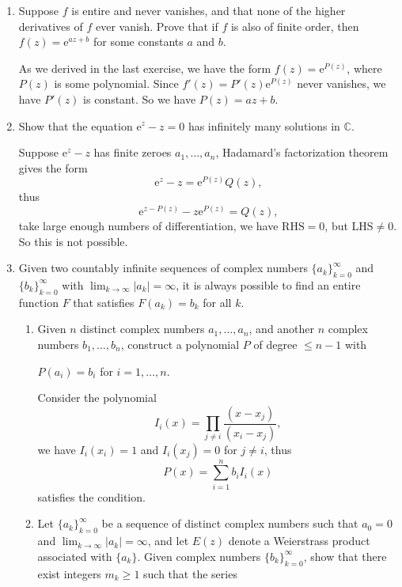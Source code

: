 \documentclass[11pt]{report}
\theoremstyle{mythm}
\let\oldendproof\endproof
\renewenvironment{proof}[1][\proofname]{%
  \oldproof[\normalfont \bfseries #1]%
}{\oldendproof}
\renewcommand*{\proofname}{Proof}
\theoremstyle{myans}
\newcommand{\me}{\mathrm{e}}
\newcommand{\bbC}{\mathbb{C}}
\begin{document}
\begin{enumerate}
  \item Suppose $f$ is entire and never vanishes, and that none of the higher derivatives of $f$ ever
  vanish. Prove that if $f$ is also of finite order, then $f(z) = \me^{az+b}$ for some constants $a$ and $b$.
  \begin{proof}
    As we derived in the last exercise, we have the form $f(z) = \me^{P(z)}$, where $P(z)$ is some
    polynomial. Since $f'(z) = P'(z)\me^{P(z)}$ never vanishes, we have $P'(z)$ is constant.
    So we have $P(z) = az+b$.
  \end{proof}
  \item Show that the equation $\me^z - z = 0$ has infinitely many solutions in $\bbC$.
  \begin{proof}
    Suppose $\me^z - z$ has finite zeroes $a_1,\dots,a_n$, Hadamard's factorization theorem gives
    the form
    \[ \me^z - z = \me^{P(z)} Q(z), \]
    thus
    \[ \me^{z-P(z)} - z\me^{P(z)} = Q(z), \]
    take large enough numbers of differentiation, we have $\mathrm{RHS} = 0$, but $\mathrm{LHS} \neq 0$.
    So this is not possible.
  \end{proof}
  \setcounter{enumi}{16}
  \item Given two countably infinite sequences of complex numbers $\{a_k\}_{k=0}^\infty$ and
  $\{b_k\}_{k=0}^\infty$ with $\lim_{k\to \infty}|a_k| = \infty$, it is always possible to find an entire
  function $F$ that satisfies $F(a_k) = b_k$ for all $k$.
  \begin{enumerate}
    \item Given $n$ distinct complex numbers $a_1,\dots,a_n$, and another $n$ complex numbers
    $b_1,\dots,b_n$, construct a polynomial $P$ of degree $\leq n-1$ with
    \begin{center}
      $P(a_i) = b_i$ \quad for $i=1,\dots,n$.
    \end{center}
    \begin{proof}
      Consider the polynomial
      \[ I_i(x) = \prod_{j\neq i} \frac{(x-x_j)}{(x_i-x_j)}, \]
      we have $I_i(x_i) = 1$ and $I_i(x_j) = 0$ for $j\neq i$, thus
      \[ P(x) = \sum_{i=1}^n b_i I_i(x) \]
      satisfies the condition.
    \end{proof}
    \item Let $\{a_k\}_{k=0}^\infty$ be a sequence of distinct complex numbers such that $a_0 = 0$
    and $\lim_{k\to \infty} |a_k| = \infty$, and let $E(z)$ denote a Weierstrass product associated
    with $\{a_k\}$. Given complex numbers $\{b_k\}_{k=0}^\infty$, show that there exist integers
    $m_k\geq 1$ such that the series

\end{enumerate}
\end{enumerate}
\end{document}
